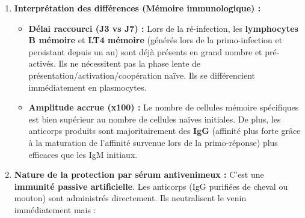\documentclass[11pt]{article}
\begin{document}
\begin{exoresolu}
\begin{enumerate}
\begin{itemize}
            \item \textbf{Activation des LB :} Parallèlement, un lymphocyte B naïf spécifique reconnaît l'antigène \emph{natif} (conformationnel) via son BCR (IgM/IgD de membrane). Il internalise l'antigène, le traite et présente des peptides sur son CMHC II.
            \item \textbf{Coopération T-B (Aide lymphocytaire) :} Le LT4 effecteur spécifique reconnaît le complexe \og peptide-CMHC II \fg sur le LB. Par contact cellulaire (CD40L/CD40) et sécrétion d'interleukines (IL-4, IL-5, IL-6), il délivre le \textbf{second signal} indispensable à l'activation complète du LB.
            \item \textbf{Différenciation en plasmocytes :} Le LB activé prolifère (prolifération clonale) et se différencie principalement en \textbf{plasmocytes}. Ces cellules, riches en réticulum endoplasmique rugueux et en appareil de Golgi, synthétisent et sécrètent massivement des \textbf{anticorps spécifiques (IgM d'abord, puis IgG après commutation de classe)} dans le sang et la lymphe. C'est l'arrivée de ces anticorps dans le sérum qui est détectée vers J7.
        \end{itemize}
        \item \textbf{Interprétation des différences (Mémoire immunologique) :}
        \begin{itemize}
            \item \textbf{Délai raccourci (J3 vs J7) :} Lors de la ré-infection, les \textbf{lymphocytes B mémoire} et \textbf{LT4 mémoire} (générés lors de la primo-infection et persistant depuis un an) sont déjà présents en grand nombre et pré-activés. Ils ne nécessitent pas la phase lente de présentation/activation/coopération naïve. Ils se différencient immédiatement en plasmocytes.
            \item \textbf{Amplitude accrue (x100) :} Le nombre de cellules mémoire spécifiques est bien supérieur au nombre de cellules naïves initiales. De plus, les anticorps produits sont majoritairement des \textbf{IgG} (affinité plus forte grâce à la maturation de l'affinité survenue lors de la primo-réponse) plus efficaces que les IgM initiaux.
        \end{itemize}
        \item \textbf{Nature de la protection par sérum antivenimeux :} C'est une \textbf{immunité passive artificielle}. Les anticorps (IgG purifiées de cheval ou mouton) sont administrés directement. Ils neutralisent le venin immédiatement mais :
        \begin{itemize}

\end{itemize}
\end{enumerate}
\end{exoresolu}
\end{document}

